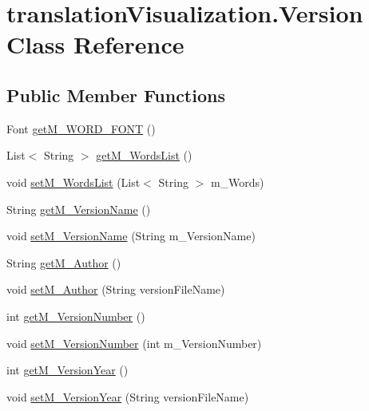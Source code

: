 \hypertarget{classtranslation_visualization_1_1_version}{}\section{translation\+Visualization.\+Version Class Reference}
\label{classtranslation_visualization_1_1_version}
\subsection*{Public Member Functions}
\begin{DoxyCompactItemize}
\item 
Font \hyperlink{classtranslation_visualization_1_1_version_a00ddc1ca0df8cc633c3a779ee13b81cf}{get\+M\+\_\+\+W\+O\+R\+D\+\_\+\+F\+O\+NT} ()
\item 
List$<$ String $>$ \hyperlink{classtranslation_visualization_1_1_version_acf622708a49469ccb939949106080c12}{get\+M\+\_\+\+Words\+List} ()
\item 
void \hyperlink{classtranslation_visualization_1_1_version_a8c41aeab41d000da67ec2cae090cc105}{set\+M\+\_\+\+Words\+List} (List$<$ String $>$ m\+\_\+\+Words)
\item 
String \hyperlink{classtranslation_visualization_1_1_version_ab54f739831734543ef48d88374b23310}{get\+M\+\_\+\+Version\+Name} ()
\item 
void \hyperlink{classtranslation_visualization_1_1_version_a292cc8922a96f69f299b3eb12e4f6bae}{set\+M\+\_\+\+Version\+Name} (String m\+\_\+\+Version\+Name)
\item 
String \hyperlink{classtranslation_visualization_1_1_version_a122a700e0290511d0fb75bbc16124e3c}{get\+M\+\_\+\+Author} ()
\item 
void \hyperlink{classtranslation_visualization_1_1_version_a01d0c95b99805c6313ec9c32d61566e0}{set\+M\+\_\+\+Author} (String version\+File\+Name)
\item 
int \hyperlink{classtranslation_visualization_1_1_version_a66d8cbf0bbe303e6dd597d1149f5ba1e}{get\+M\+\_\+\+Version\+Number} ()
\item 
void \hyperlink{classtranslation_visualization_1_1_version_a6850428c26c2d1e29ab34042b25a00d5}{set\+M\+\_\+\+Version\+Number} (int m\+\_\+\+Version\+Number)
\item 
int \hyperlink{classtranslation_visualization_1_1_version_a5c63860efc09b62890a595c28a7b9129}{get\+M\+\_\+\+Version\+Year} ()
\item 
void \hyperlink{classtranslation_visualization_1_1_version_a4151be9b0ec9b16a26c2a9ccfc49c69b}{set\+M\+\_\+\+Version\+Year} (String version\+File\+Name)

\end{DoxyCompactItemize}
